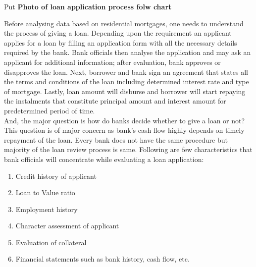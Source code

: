 {Put \textbf{Photo of loan application process folw chart}

Before analysing data based on residential mortgages, one needs to understand the process of giving a loan. Depending upon the requirement an applicant applies for a loan by filling an application form with all the necessary details required by the bank. Bank officials then analyse the application and may ask an applicant for additional information; after evaluation, bank approves or disapproves the loan. Next, borrower and bank sign an agreement that states all the terms and conditions of the loan including determined interest rate and type of mortgage. Lastly, loan amount will disburse and borrower will start repaying the instalments that constitute principal amount and interest amount for predetermined period of time.\\

And, the major question is how do banks decide whether to give a loan or not? This question is of major concern as bank's cash flow highly depends on timely repayment of the loan. Every bank does not have the same procedure but majority of the loan review process is same. Following are few characteristics that bank officials will concentrate while evaluating a loan application:
\begin{enumerate}
	\item Credit history of applicant
	\item Loan to Value ratio
	\item Employment history
	\item Character assessment of applicant
	\item Evaluation of collateral
	\item Financial statements such as bank history, cash flow, etc. 
\end{enumerate}

}
